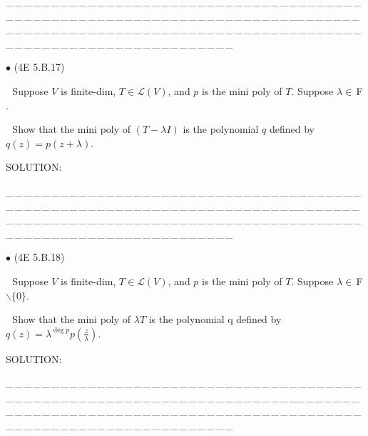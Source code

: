 \documentclass[a4paper, 11pt, UTF8]{article}
\def\Lm{\mathcal{L}}
\def\Fbfc{$\,{\timesbf F}$}
\begin{document}
\begin{large}
\par
{\tiny \_\,\_\,\_\,\_\,\_\,\_\,\_\,\_\,\_\,\_\,\_\,\_\,\_\,\_\,\_\,\_\,\_\,\_\,\_\,\_\,\_\,\_\,\_\,\_\,\_\,\_\,\_\,\_\,\_\,\_\,\_\,\_\,\_\,\_\,\_\,\_\,\_\,\_\,\_\,\_\,\_\,\_\,\_\,\_\,\_\,\_\,\_\,\_\,\_\,\_\,\_\,\_\,\_\,\_\,\_\,\_\,\_\,\_\,\_\,\_\,\_\,\_\,\_\,\_\,\_\,\_\,\_\,\_\,\_\,\_\,\_\_\,\_\,\_\,\_\,\_\,\_\,\_\,\_\,\_\,\_\,\_\,\_\,\_\,\_\,\_\,\_\,\_\,\_\,\_\,\_\,\_\,\_\,\_\,\_\,\_\,\_\,\_\,\_\,\_\,\_\,\_\,\_\,\_\,\_\,\_\,\_\,\_\,\_\,\_\,\_\,\_\,\_\,\_\,\_\,\_\,\_\,\_\,\_\,\_\,\_\,\_\,\_\,\_\,\_\,\_\,\_\,\_\,\_\,\_\,\_\,\_\,\_\,\_\,\_\,\_\,\_\,\_\,\_\,\_\,\_\,\_}\par

{\small $\bullet$} (\normalsize{4E 5.B.17})\par\,\, {\timessl\Large 
Suppose $V$ is finite-dim, $T\in \Lm(V)$, and $p$ is the mini poly of $T$. Suppose $\lambda \in\Fbfc.$}\par\,\,
{\timessl\Large Show that the mini poly of $(T - \lambda I)$ is the polynomial $q$ defined by $q(z) = p(z + \lambda).$
}\par
{\timesbf S\footnotesize{OLUTION:}}\par\quad

\par
{\tiny \_\,\_\,\_\,\_\,\_\,\_\,\_\,\_\,\_\,\_\,\_\,\_\,\_\,\_\,\_\,\_\,\_\,\_\,\_\,\_\,\_\,\_\,\_\,\_\,\_\,\_\,\_\,\_\,\_\,\_\,\_\,\_\,\_\,\_\,\_\,\_\,\_\,\_\,\_\,\_\,\_\,\_\,\_\,\_\,\_\,\_\,\_\,\_\,\_\,\_\,\_\,\_\,\_\,\_\,\_\,\_\,\_\,\_\,\_\,\_\,\_\,\_\,\_\,\_\,\_\,\_\,\_\,\_\,\_\,\_\,\_\_\,\_\,\_\,\_\,\_\,\_\,\_\,\_\,\_\,\_\,\_\,\_\,\_\,\_\,\_\,\_\,\_\,\_\,\_\,\_\,\_\,\_\,\_\,\_\,\_\,\_\,\_\,\_\,\_\,\_\,\_\,\_\,\_\,\_\,\_\,\_\,\_\,\_\,\_\,\_\,\_\,\_\,\_\,\_\,\_\,\_\,\_\,\_\,\_\,\_\,\_\,\_\,\_\,\_\,\_\,\_\,\_\,\_\,\_\,\_\,\_\,\_\,\_\,\_\,\_\,\_\,\_\,\_\,\_\,\_\,\_}\par

{\small $\bullet$} (\normalsize{4E 5.B.18})\par\,\, {\timessl\Large 
Suppose $V$ is finite-dim, $T\in \Lm(V)$, and $p$ is the mini poly of $T$. Suppose $\lambda \in\Fbfc\backslash\{0\}$.}\par\,\,
{\timessl\Large Show that the mini poly of $\lambda T$ is the polynomial q defined by $q(z) = \lambda^{\deg p} p(\frac{z}{\lambda})$.
}\par
{\timesbf S\footnotesize{OLUTION:}}\par\quad

\par
{\tiny \_\,\_\,\_\,\_\,\_\,\_\,\_\,\_\,\_\,\_\,\_\,\_\,\_\,\_\,\_\,\_\,\_\,\_\,\_\,\_\,\_\,\_\,\_\,\_\,\_\,\_\,\_\,\_\,\_\,\_\,\_\,\_\,\_\,\_\,\_\,\_\,\_\,\_\,\_\,\_\,\_\,\_\,\_\,\_\,\_\,\_\,\_\,\_\,\_\,\_\,\_\,\_\,\_\,\_\,\_\,\_\,\_\,\_\,\_\,\_\,\_\,\_\,\_\,\_\,\_\,\_\,\_\,\_\,\_\,\_\,\_\_\,\_\,\_\,\_\,\_\,\_\,\_\,\_\,\_\,\_\,\_\,\_\,\_\,\_\,\_\,\_\,\_\,\_\,\_\,\_\,\_\,\_\,\_\,\_\,\_\,\_\,\_\,\_\,\_\,\_\,\_\,\_\,\_\,\_\,\_\,\_\,\_\,\_\,\_\,\_\,\_\,\_\,\_\,\_\,\_\,\_\,\_\,\_\,\_\,\_\,\_\,\_\,\_\,\_\,\_\,\_\,\_\,\_\,\_\,\_\,\_\,\_\,\_\,\_\,\_\,\_\,\_\,\_\,\_\,\_\,\_}\par


\end{large}
\end{document}
